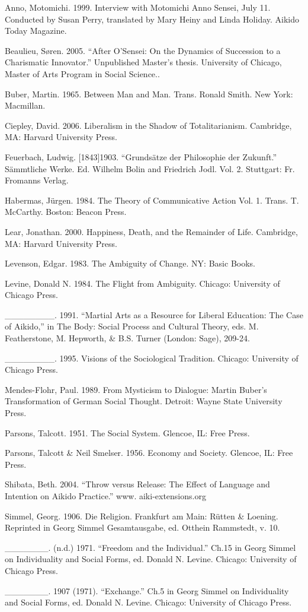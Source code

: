 \begin{list}{}{}
\item Anno, Motomichi. 1999. Interview with Motomichi Anno Sensei, July 11. Conducted by Susan Perry, translated by Mary Heiny and Linda Holiday. Aikido Today Magazine.
\item Beaulieu, S\o{}ren. 2005. ``After O'Sensei: On the Dynamics of Succession to a Charismatic Innovator.'' Unpublished Master's thesis. University of Chicago, Master of Arts Program in Social Science..
\item Buber, Martin. 1965. Between Man and Man. Trans. Ronald Smith. New York: Macmillan.
\item Ciepley, David. 2006. Liberalism in the Shadow of Totalitarianism. Cambridge, MA: Harvard University Press. 
\item Feuerbach, Ludwig. [1843]1903. ``Grunds\"{a}tze der Philosophie der Zukunft.'' S\"{a}mmtliche Werke. Ed. Wilhelm Bolin and Friedrich Jodl. Vol. 2. Stuttgart: Fr. Fromanns Verlag.
\item Habermas, J\"{u}rgen. 1984. The Theory of Communicative Action Vol. 1. Trans. T. McCarthy. Boston: Beacon Press. 
\item Lear, Jonathan. 2000. Happiness, Death, and the Remainder of Life. Cambridge, MA: Harvard University Press.
\item Levenson, Edgar. 1983. The Ambiguity of Change. NY: Basic Books.
\item Levine, Donald N. 1984. The Flight from Ambiguity. Chicago: University of Chicago Press.
\item \_\_\_\_\_\_\_\_. 1991. ``Martial Arts as a Resource for Liberal Education: The Case of Aikido,'' in The Body: Social Process and Cultural Theory, eds. M. Featherstone, M. Hepworth, \& B.S. Turner (London: Sage), 209-24.
\item \_\_\_\_\_\_\_\_. 1995. Visions of the Sociological Tradition. Chicago: University of Chicago Press.
\item Mendes-Flohr, Paul. 1989. From Mysticism to Dialogue: Martin Buber's Transformation of German Social Thought. Detroit: Wayne State University Press.
\item Parsons, Talcott. 1951. The Social System. Glencoe, IL: Free Press.
\item Parsons, Talcott \& Neil Smelser. 1956. Economy and Society. Glencoe, IL: Free Press.
\item Shibata, Beth. 2004. ``Throw versus Release: The Effect of Language and Intention on Aikido Practice.'' www. aiki-extensions.org
\item Simmel, Georg. 1906. Die Religion. Frankfurt am Main: R\"{u}tten \& Loening. Reprinted in Georg Simmel Gesamtausgabe, ed. Otthein Rammstedt, v. 10. 
\item \_\_\_\_\_\_\_. (n.d.) 1971. ``Freedom and the Individual.'' Ch.15 in Georg Simmel on Individuality and Social Forms, ed. Donald N. Levine. Chicago: University of Chicago Press.
\item \_\_\_\_\_\_\_. 1907 (1971). ``Exchange.'' Ch.5 in Georg Simmel on Individuality and Social Forms, ed. Donald N. Levine. Chicago: University of Chicago Press.
\end{list}